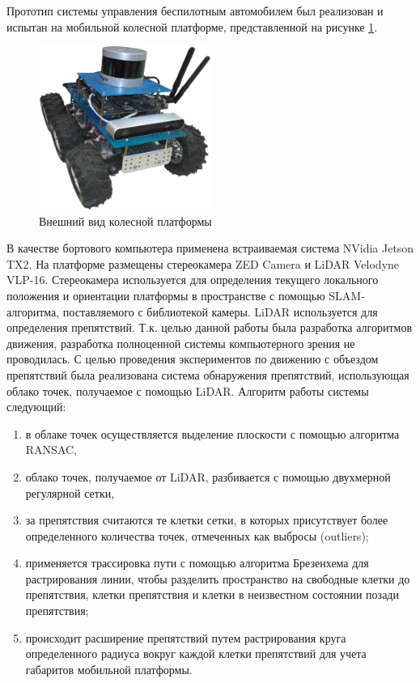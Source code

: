 Прототип системы управления беспилотным автомобилем был реализован и испытан на мобильной
колесной платформе, представленной на рисунке \ref{img:car}.

\begin{figure}[h]
    \centering
    \includegraphics[width=0.5\textwidth]{images/car}
    \caption{Внешний вид колесной платформы}
    \label{img:car}
\end{figure}

В качестве бортового компьютера применена встраиваемая система NVidia Jetson TX2. На платформе размещены
стереокамера ZED Camera и LiDAR Velodyne VLP-16. Стереокамера используется для определения текущего локального
положения и ориентации платформы в пространстве с помощью SLAM-алгоритма, поставляемого с библиотекой
камеры. LiDAR используется для определения препятствий. Т.к. целью данной работы была разработка алгоритмов
движения, разработка полноценной системы компьютерного зрения не проводилась. С целью проведения экспериментов
по движению с объездом препятствий была реализована система обнаружения препятствий, использующая облако
точек, получаемое с помощью LiDAR. Алгоритм работы системы следующий:
\begin{enumerate}
    \item в облаке точек осуществляется выделение плоскости с помощью алгоритма RANSAC,
    \item облако точек, получаемое от LiDAR, разбивается с помощью двухмерной регулярной сетки,
    \item за препятствия считаются те клетки сетки, в которых присутствует более определенного
          количества точек, отмеченных как выбросы (outliers);
    \item применяется трассировка пути с помощью алгоритма Брезенхема для растрирования линии, чтобы
          разделить пространство на свободные клетки до препятствия, клетки препятствия и клетки в неизвестном
          состоянии позади препятствия;
    \item происходит расширение препятствий путем растрирования круга определенного радиуса вокруг каждой
          клетки препятствий для учета габаритов мобильной платформы.
\end{enumerate}

